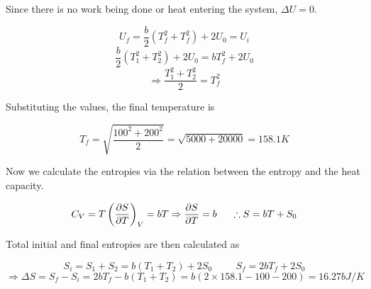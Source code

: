         Since there is no work being done or heat entering the system, $\Delta U = 0$. 
        
        \begin{equation}
            U_f = \frac{b}{2}(T_f^2 + T_f^2) + 2U_0 = U_i
        \end{equation}
        \begin{equation}
            \frac{b}{2}(T_1^2+T_2^2) + 2U_0 = bT_f^2 + 2U_0
        \end{equation}
        \begin{equation}
            \Rightarrow \frac{T_1^2+T_2^2}{2} = T_f^2
        \end{equation}
        
        Substituting the values, the final temperature is
        
        \begin{equation}
            T_f = \sqrt{\frac{100^2+200^2}{2}} = \sqrt{5000+20000} = \boxed{158.1\si{K} }
        \end{equation}
        
        Now we calculate the entropies via the relation between the entropy and the heat capacity.
        
        \begin{equation}
            C_V = T\left( \frac{\partial S}{\partial T} \right)_V = bT \Rightarrow \frac{\partial S}{\partial T} = b \hspace{0.5cm} \therefore S = bT + S_0 
        \end{equation}
        
        Total initial and final entropies are then calculated as
        
        \begin{equation}
            S_i = S_1+S_2 = b(T_1+T_2) + 2S_0 \hspace{1cm} S_f = 2bT_f + 2S_0
        \end{equation}
        \begin{equation}
            \Rightarrow \Delta S = S_f-S_i = 2bT_f - b(T_1+T_2) = b(2\times158.1-100-200) = \boxed{16.27b \si{J/K}}
        \end{equation}

